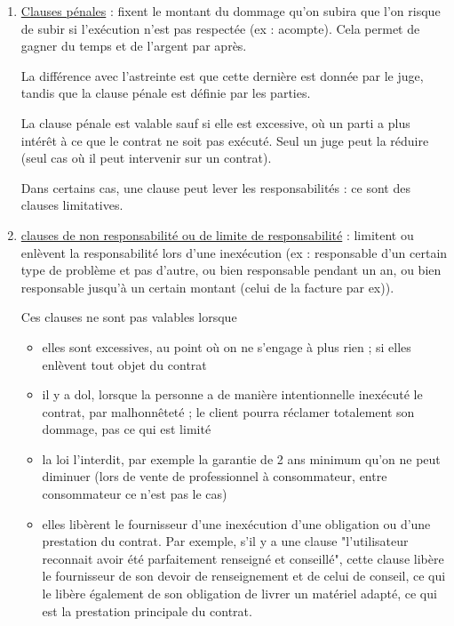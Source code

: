 			\begin{enumerate}
				\item \underline{Clauses pénales} : fixent le montant du dommage qu'on subira que l'on risque de subir si l'exécution n'est pas respectée (ex : acompte). Cela permet de gagner du temps et de l'argent par après.
			
				La différence avec l'astreinte est que cette dernière est donnée par le juge, tandis que la clause pénale est définie par les parties.
			
				La clause pénale est valable sauf si elle est excessive, où un parti a plus intérêt à ce que le contrat ne soit pas exécuté. Seul un juge peut la réduire (seul cas où il peut intervenir sur un contrat).
			
				Dans certains cas, une clause peut lever les responsabilités : ce sont des clauses limitatives.	

			
				\item \underline{clauses de non responsabilité ou de limite de responsabilité} : limitent ou enlèvent la responsabilité lors d'une inexécution (ex : responsable d'un certain type de problème et pas d'autre, ou bien responsable pendant un an, ou bien responsable jusqu'à un certain montant (celui de la facture par ex)).
						
				Ces clauses ne sont pas valables lorsque
				\begin{itemize}
					\item elles sont excessives, au point où on ne s'engage à plus rien ; si elles enlèvent tout objet du contrat
					\item il y a dol, lorsque la personne a de manière intentionnelle inexécuté le contrat, par malhonnêteté ; le client pourra réclamer totalement son dommage, pas ce qui est limité
					\item la loi l'interdit, par exemple la garantie de 2 ans minimum qu'on ne peut diminuer (lors de vente de professionnel à consommateur, entre consommateur ce n'est pas le cas)
					
					\item elles libèrent le fournisseur d'une inexécution d'une obligation ou d'une prestation du contrat. Par exemple, s'il y a une clause "l'utilisateur reconnait avoir été parfaitement renseigné et conseillé", cette clause libère le fournisseur de son devoir de renseignement et de celui de conseil, ce qui le libère également de son obligation de livrer un matériel adapté, ce qui est la prestation principale du contrat.
				\end{itemize}
				

\end{enumerate}
